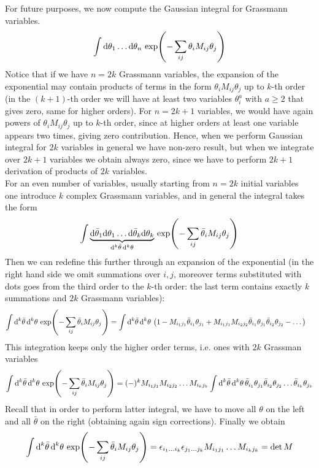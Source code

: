 \documentclass[../main/main.tex]{subfiles}
\begin{document}
For future purposes, we now compute the Gaussian integral for Grassmann variables. 
\[\int\textup{d}\theta_1\dots\textup{d}\theta_n\,\exp(-\sum_{ij}\theta_iM_{ij}\theta_j)\]
Notice that if we have $n=2k$ Grassmann variables, the expansion of the exponential may contain products of terms in the form $\theta_iM_{ij}\theta_j$ up to $k$-th order (in the $(k+1)$-th order we will have at least two variables $\theta_i^a$ with $a\geq2$ that gives zero, same for higher orders). For $n=2k+1$ variables, we would have again powers of $\theta_iM_{ij}\theta_j$ up to $k$-th order, since at higher orders at least one variable appears two times, giving zero contribution. Hence, when we perform Gaussian integral for $2k$ variables in general we have non-zero result, but when we integrate over $2k+1$ variables we obtain always zero, since we have to perform $2k+1$ derivation of products of $2k$ variables. \\
For an even number of variables, usually starting from $n=2k$ initial variables one introduce $k$ complex Grassmann variables, and in general the integral takes the form
\[\int\underbrace{\textup{d}\bar\theta_1\textup{d}\theta_1\dots\textup{d}\bar\theta_k\textup{d}\theta_k}_{\textup{d}^k\bar\theta\,\textup{d}^k\theta}\,\exp(-\sum_{ij}\bar\theta_iM_{ij}\theta_j)\]
Then we can redefine this further through an expansion of the exponential (in the right hand side we omit summations over $i,j$, moreover terms substituted with dots goes from the third order to the $k$-th order: the last term contains exactly $k$ summations and $2k$ Grassmann variables):
\begin{align*}
\int\textup{d}^k\bar\theta\,\textup{d}^k\theta\,\exp(-\sum_{ij}\bar\theta_iM_{ij}\theta_j)
&=\int\textup{d}^k\bar\theta\,\textup{d}^k\theta\,\left(1-M_{i_1j_1}\bar\theta_{i_1}\theta_{j_1}+M_{i_1j_1}M_{i_2j_2}\bar\theta_{i_1}\theta_{j_1}\bar\theta_{i_2}\theta_{j_2}-\dots\right)
\end{align*}
This integration keeps only the higher order terms, i.e. ones with $2k$ Grassman variables
\[\int\textup{d}^k\bar\theta\,\textup{d}^k\theta\,\exp(-\sum_{ij}\bar\theta_iM_{ij}\theta_j)=(-)^kM_{i_1j_1}M_{i_2j_2}\dots M_{i_kj_k}\int\textup{d}^k\bar\theta\,\textup{d}^k\theta\,\bar\theta_{i_1}\theta_{j_1}\bar\theta_{i_2}\theta_{j_2}\dots\bar\theta_{i_k}\theta_{j_k}\]
Recall that in order to perform latter integral, we have to move all $\theta$ on the left and all $\bar\theta$ on the right (obtaining again sign corrections). Finally we obtain
\[\int\de^k\bar\theta\,\de^k\theta\,\exp(-\sum_{ij}\bar\theta_iM_{ij}\theta_j)=\epsilon_{i_1\dots i_k}\epsilon_{j_1\dots j_k}M_{i_1j_1}\dots M_{i_kj_k}=\det M\]
\end{document}
